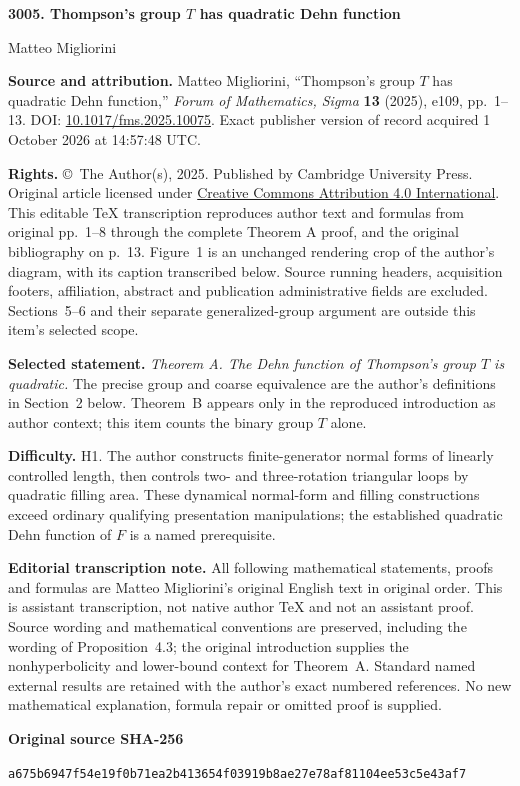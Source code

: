\documentclass[10pt,a4paper]{article}
\newcommand{\sourcepagenumber}{editorial cover}
\newcommand{\SourcePage}[1]{\clearpage\gdef\sourcepagenumber{#1}}
\begin{document}
\thispagestyle{plain}
\begin{center}
{\Large\bfseries 3005. Thompson's group $T$ has quadratic Dehn function}\par
\medskip
{\large Matteo Migliorini}
\end{center}
\noindent\textbf{Source and attribution.} Matteo Migliorini, ``Thompson's group $T$ has quadratic Dehn function,'' \emph{Forum of Mathematics, Sigma} \textbf{13} (2025), e109, pp.~1--13. DOI: \href{https://doi.org/10.1017/fms.2025.10075}{10.1017/fms.2025.10075}. Exact publisher version of record acquired 1 October 2026 at 14:57:48 UTC.\par
\noindent\textbf{Rights.} \copyright\ The Author(s), 2025. Published by Cambridge University Press. Original article licensed under \href{https://creativecommons.org/licenses/by/4.0/}{Creative Commons Attribution 4.0 International}. This editable TeX transcription reproduces author text and formulas from original pp.~1--8 through the complete Theorem A proof, and the original bibliography on p.~13. Figure~1 is an unchanged rendering crop of the author's diagram, with its caption transcribed below. Source running headers, acquisition footers, affiliation, abstract and publication administrative fields are excluded. Sections~5--6 and their separate generalized-group argument are outside this item's selected scope.\par
\noindent\textbf{Selected statement.} \emph{Theorem A. The Dehn function of Thompson's group $T$ is quadratic.} The precise group and coarse equivalence are the author's definitions in Section~2 below. Theorem~B appears only in the reproduced introduction as author context; this item counts the binary group $T$ alone.\par
\noindent\textbf{Difficulty.} H1. The author constructs finite-generator normal forms of linearly controlled length, then controls two- and three-rotation triangular loops by quadratic filling area. These dynamical normal-form and filling constructions exceed ordinary qualifying presentation manipulations; the established quadratic Dehn function of $F$ is a named prerequisite.\par
\noindent\textbf{Editorial transcription note.} All following mathematical statements, proofs and formulas are Matteo Migliorini's original English text in original order. This is assistant transcription, not native author TeX and not an assistant proof. Source wording and mathematical conventions are preserved, including the wording of Proposition~4.3; the original introduction supplies the nonhyperbolicity and lower-bound context for Theorem~A. Standard named external results are retained with the author's exact numbered references. No new mathematical explanation, formula repair or omitted proof is supplied.\par
\medskip
\noindent\textbf{Original source SHA-256}\par
\small\texttt{a675b6947f54e19f0b71ea2b413654f03919b8ae27e78af81104ee53c5e43af7}\normalsize
\SourcePage{1}
\end{document}
